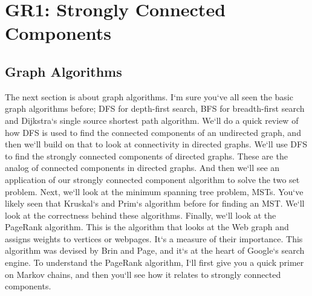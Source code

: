 \section{GR1: Strongly Connected Components}

\subsection{Graph Algorithms}
The next section is about graph algorithms.
I`m sure you`ve all seen the basic graph algorithms before; DFS for depth-first search, BFS for breadth-first search and Dijkstra`s single source shortest path algorithm.
We`ll do a quick review of how DFS is used to find the connected components of an undirected graph, and then we`ll build on that to look at connectivity in directed graphs.
We`ll use DFS to find the strongly connected components of directed graphs.
These are the analog of connected components in directed graphs.
And then we`ll see an application of our strongly connected component algorithm to solve the two set problem.
Next, we`ll look at the minimum spanning tree problem, MSTs.
You`ve likely seen that Kruskal`s and Prim`s algorithm before for finding an MST\@.
We`ll look at the correctness behind these algorithms.
Finally, we`ll look at the PageRank algorithm.
This is the algorithm that looks at the Web graph and assigns weights to vertices or webpages.
It`s a measure of their importance.
This algorithm was devised by Brin and Page, and it`s at the heart of Google`s search engine.
To understand the PageRank algorithm, I`ll first give you a quick primer on Markov chains, and then you`ll see how it relates to strongly connected components.

